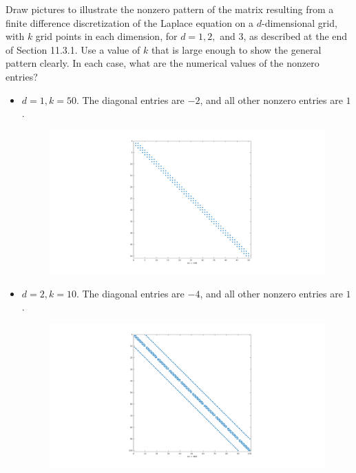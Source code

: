 \begin{pro}
  Draw pictures to illustrate the nonzero pattern of the matrix
  resulting from a finite difference discretization of the Laplace
  equation on a $d$-dimensional grid,
  with $k$ grid points in each dimension,
  for $d=1, 2, $ and $3$,
  as described at the end of Section 11.3.1.
  Use a value of $k$ that is large enough to show
  the general pattern clearly.
  In each case,
  what are the numerical values of the nonzero entries?
\end{pro}
\begin{sol}
  \begin{itemize}
  \item
    $d=1, k=50$. The diagonal entries are $-2$,
    and all other nonzero entries are $1$.
      \begin{figure}[H]
    \centering
    \includegraphics[scale=0.30]{1d50.png}
  \end{figure}

\item
  $d=2, k=10$. The diagonal entries are $-4$,
  and all other nonzero entries are $1$.
    \begin{figure}[H]
    \centering
    \includegraphics[scale=0.25]{2d10.png}
  \end{figure}


\end{itemize}
\end{sol}
